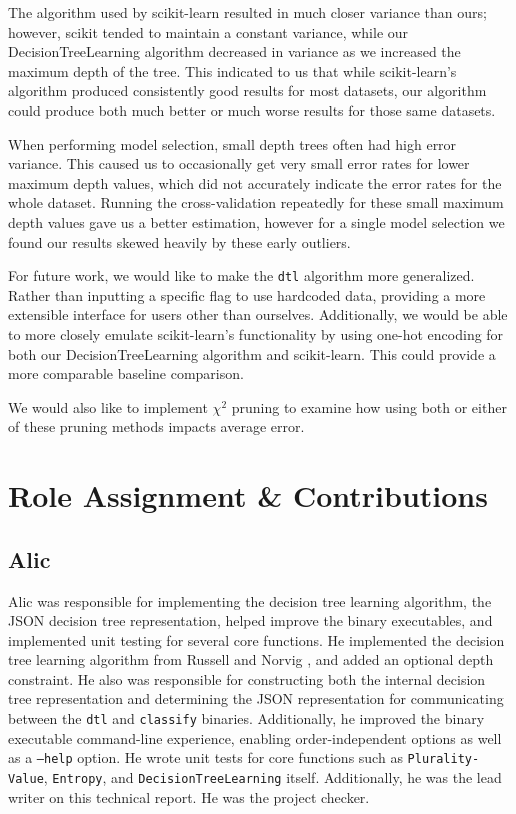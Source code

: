 \documentclass[screen, authorversion, nonacm, sigconf]{acmart}
\begin{document}
The algorithm used by scikit-learn resulted in much closer variance than ours; however, scikit tended to maintain a constant variance, while our DecisionTreeLearning algorithm decreased in variance as we increased the maximum depth of the tree. This indicated to us that while scikit-learn's algorithm produced consistently good results for most datasets, our algorithm could produce both much better or much worse results for those same datasets.

When performing model selection, small depth trees often had high error variance. This caused us to occasionally get very small error rates for lower maximum depth values, which did not accurately indicate the error rates for the whole dataset. Running the cross-validation repeatedly for these small maximum depth values gave us a better estimation, however for a single model selection we found our results skewed heavily by these early outliers.

For future work, we would like to make the \texttt{dtl} algorithm more generalized. Rather than inputting a specific flag to use hardcoded data, providing a more extensible interface for users other than ourselves. Additionally, we would be able to more closely emulate scikit-learn's functionality by using one-hot encoding for both our DecisionTreeLearning algorithm and scikit-learn. This could provide a more comparable baseline comparison.

We would also like to implement $\chi^2$ pruning to examine how using both or either of these pruning methods impacts average error.

\section{Role Assignment \& Contributions}

\subsection{Alic}

Alic was responsible for implementing the decision tree learning algorithm, the JSON decision tree representation, helped improve the binary executables, and implemented unit testing for several core functions. He implemented the decision tree learning algorithm from Russell and Norvig \cite{russell_norvig_2010}, and added an optional depth constraint. He also was responsible for constructing both the internal decision tree representation and determining the JSON representation for communicating between the \texttt{dtl} and \texttt{classify} binaries. Additionally, he improved the binary executable command-line experience, enabling order-independent options as well as a \texttt{--help} option. He wrote unit tests for core functions such as \texttt{Plurality-Value}, \texttt{Entropy}, and \texttt{DecisionTreeLearning} itself. Additionally, he was the lead writer on this technical report. He was the project checker.
\end{document}
